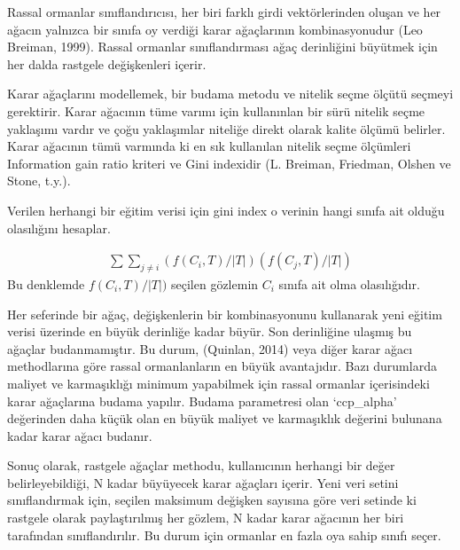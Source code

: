 \documentclass[12pt,twoside]{deuthesis}
\begin{document}
Rassal ormanlar sınıflandırıcısı, her biri farklı girdi vektörlerinden oluşan ve her ağacın yalnızca bir sınıfa oy verdiği karar ağaçlarının kombinasyonudur (Leo Breiman, 1999). Rassal ormanlar sınıflandırması ağaç derinliğini büyütmek için her dalda rastgele değişkenleri içerir.

Karar ağaçlarını modellemek, bir budama metodu ve nitelik seçme ölçütü seçmeyi gerektirir. Karar ağacının tüme varımı için kullanınlan bir sürü nitelik seçme yaklaşımı vardır ve çoğu yaklaşımlar niteliğe direkt olarak kalite ölçümü belirler. Karar ağacının tümü varmında ki en sık kullanılan nitelik seçme ölçümleri Information gain ratio kriteri ve Gini indexidir (L. Breiman, Friedman, Olshen ve Stone, t.y.).

Verilen herhangi bir eğitim verisi için gini index o verinin hangi sınıfa ait olduğu olasılığını hesaplar.

\[\begin{aligned}
\sum \sum_{j \neq i}(f(C_{i}, T) /|T|)(f(C_{j}, T) /|T|)
\end{aligned}\]
Bu denklemde \(f(C_{i}, T) /|T|)\) seçilen gözlemin \(C_{i}\) sınıfa ait olma olasılığıdır.

Her seferinde bir ağaç, değişkenlerin bir kombinasyonunu kullanarak yeni eğitim verisi üzerinde en büyük derinliğe kadar büyür. Son derinliğine ulaşmış bu ağaçlar budanmamıştır. Bu durum, (Quinlan, 2014) veya diğer karar ağacı methodlarına göre rassal ormanlanların en büyük avantajıdır. Bazı durumlarda maliyet ve karmaşıklığı minimum yapabilmek için rassal ormanlar içerisindeki karar ağaçlarına budama yapılır. Budama parametresi olan `ccp\_alpha' değerinden daha küçük olan en büyük maliyet ve karmaşıklık değerini bulunana kadar karar ağacı budanır.

Sonuç olarak, rastgele ağaçlar methodu, kullanıcının herhangi bir değer belirleyebildiği, N kadar büyüyecek karar ağaçları içerir. Yeni veri setini sınıflandırmak için, seçilen maksimum değişken sayısına göre veri setinde ki rastgele olarak paylaştırılmış her gözlem, N kadar karar ağacının her biri tarafından sınıflandırılır. Bu durum için ormanlar en fazla oya sahip sınıfı seçer.\\
\end{document}
